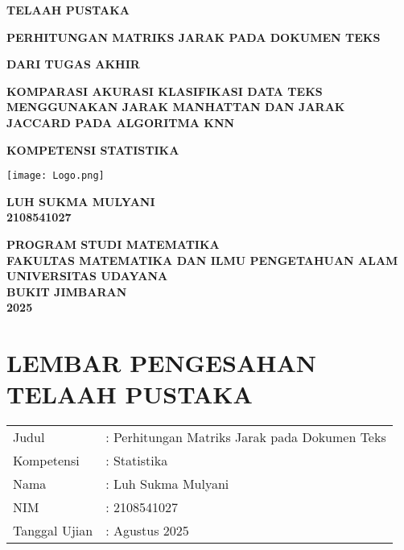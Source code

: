 \documentclass[a4paper,12pt]{report}
\numberwithin{equation}{chapter}
\begin{document}
\pagestyle{frontmatter}

\begin{titlepage}
    \centering
    \normalsize
    \textbf{TELAAH PUSTAKA}
    \vspace*{1cm}

    \normalsize
    \textbf{PERHITUNGAN MATRIKS JARAK PADA DOKUMEN TEKS}
    \vspace*{1cm}

    \normalsize
    \textbf{DARI TUGAS AKHIR}
    \vspace*{1cm}
    
    \normalsize
    \textbf{KOMPARASI AKURASI KLASIFIKASI DATA TEKS MENGGUNAKAN JARAK MANHATTAN DAN JARAK JACCARD PADA ALGORITMA KNN}
    
    \vspace{1cm}
    \normalsize
    \textbf{KOMPETENSI STATISTIKA}

    \vspace{1cm}
    \centering
    \texttt{[image: Logo.png]}
    
    \vspace{1cm}

    \textbf{LUH SUKMA MULYANI\\
    2108541027\\}
    
    \vfill
    
    \normalsize
    \textbf{PROGRAM STUDI MATEMATIKA\\
    FAKULTAS MATEMATIKA DAN ILMU PENGETAHUAN ALAM\\
    UNIVERSITAS UDAYANA\\
    BUKIT JIMBARAN\\
    2025}
\end{titlepage}

\newpage
\renewcommand{\appendixname}{}
\chapter*{LEMBAR PENGESAHAN TELAAH PUSTAKA}
\begin{flushleft}
    \begin{tabularx}{\textwidth}{l X}
        Judul & : Perhitungan Matriks Jarak pada Dokumen Teks \\
        Kompetensi & : Statistika \\
        Nama & : Luh Sukma Mulyani \\
        NIM & : 2108541027 \\
        Tanggal Ujian & : \hspace{1cm} Agustus 2025 \\
    \end{tabularx}
\end{flushleft}
\end{document}
